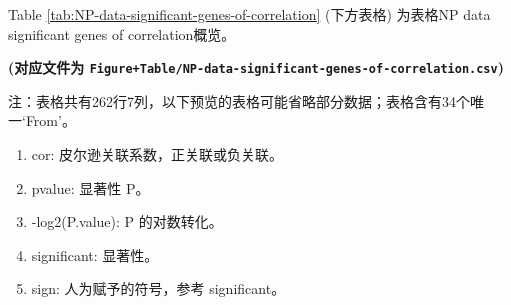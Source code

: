 \documentclass[
]{article}
\providecommand{\tightlist}{%
  \setlength{\itemsep}{0pt}\setlength{\parskip}{0pt}}
\begin{document}
Table \ref{tab:NP-data-significant-genes-of-correlation} (下方表格) 为表格NP data significant genes of correlation概览。

\textbf{(对应文件为 \texttt{Figure+Table/NP-data-significant-genes-of-correlation.csv})}

\begin{center}\begin{tcolorbox}[colback=gray!10, colframe=gray!50, width=0.9\linewidth, arc=1mm, boxrule=0.5pt]注：表格共有262行7列，以下预览的表格可能省略部分数据；表格含有34个唯一`From'。
\end{tcolorbox}
\end{center}
\begin{center}\begin{tcolorbox}[colback=gray!10, colframe=gray!50, width=0.9\linewidth, arc=1mm, boxrule=0.5pt]\begin{enumerate}\tightlist
\item cor: 皮尔逊关联系数，正关联或负关联。
\item pvalue: 显著性 P。
\item -log2(P.value): P 的对数转化。
\item significant: 显著性。
\item sign: 人为赋予的符号，参考 significant。
\end{enumerate}\end{tcolorbox}
\end{center}
\end{document}

